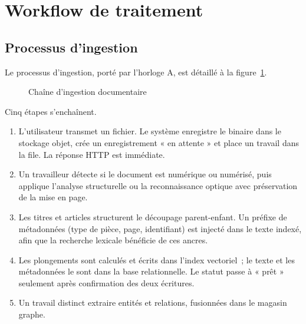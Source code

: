 \section{Workflow de traitement}
\label{sec:ch2-workflow}

\subsection{Processus d'ingestion}

Le processus d'ingestion, porté par l'horloge A, est détaillé à la
figure~\ref{fig:ingestion}.

\begin{figure}[htbp]
  \centering
  \resizebox{\linewidth}{!}{}
  \caption{Chaîne d'ingestion documentaire}
  \label{fig:ingestion}
\end{figure}

Cinq étapes s'enchaînent.

\begin{enumerate}
  \item {} L'utilisateur transmet un fichier. Le système
        enregistre le binaire dans le stockage objet, crée un
        enregistrement « en attente » et place un travail dans la file.
        La réponse HTTP est immédiate.
  \item {} Un travailleur détecte si le document est
        numérique ou numérisé, puis applique l'analyse structurelle ou la
        reconnaissance optique avec préservation de la mise en page.
  \item {} Les titres et articles structurent le
        découpage parent-enfant. Un préfixe de métadonnées (type de pièce,
        page, identifiant) est injecté dans le texte indexé, afin que la
        recherche lexicale bénéficie de ces ancres.
  \item {} Les plongements sont calculés et écrits dans
        l'index vectoriel~; le texte et les métadonnées le sont dans la
        base relationnelle. Le statut passe à « prêt » seulement après
        confirmation des deux écritures.
  \item {} Un travail distinct extraire
        entités et relations, fusionnées dans le magasin graphe.
\end{enumerate}

